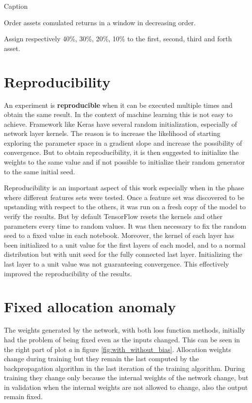 \begin{algorithm}[h]
\caption{Caption}
\label{alg1}
\begin{algorithmic}
\item Order assets comulated returns in a window in decreasing order. 
\item Assign respectively 40\%, 30\%, 20\%, 10\% to the first, second, third and forth asset.

\end{algorithmic}
\end{algorithm}


\section{Reproducibility}
\label{s:reproducibility}
An experiment is \textbf{reproducible} when it can be executed multiple times and obtain the same result. In the context of machine learning this is not easy to achieve. Framework like Keras have several random initialization, especially of network layer kernels. The reason is to increase the likelihood of starting exploring the parameter space in a gradient slope and increase the possibility of convergence. But to obtain reproducibility, it is then suggested to initialize the weights to the same value and if not possible to initialize their random generator to the same initial seed.

\hfill \break

Reproducibility is an  important aspect of this work especially when in the phase where different features sets were tested. Once a feature set was discovered to be upstanding with respect to the others, it was run on a fresh copy of the model to verify the results. But by default TensorFlow resets the kernels and other parameters every time to random values. It was then necessary to fix the random seed to a fixed value in each notebook. Moreover, the kernel of each layer has been initialized to a unit value for the first layers of each model, and to a normal distribution but with unit seed for the fully connected last layer. Initializing the last layer to a unit value was not guaranteeing convergence. This effectively improved the reproducibility of the results.

\section{Fixed allocation anomaly}
\label{s:fixed_allocation_anomaly}

The weights generated by the network, with both loss function methods, initially had the problem of being fixed even as the inputs changed. This can be seen in the right part of plot \textit{a} in figure \ref{fig:with_without_bias}. Allocation weights change during training but they remain the last computed by the backpropagation algorithm in the last iteration of the training algorithm. During training they change only because the internal weights of the network change, but in validation when the internal weights are not allowed to change, also the output remain fixed. 

